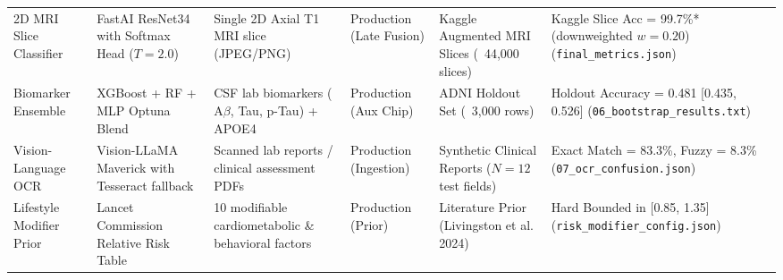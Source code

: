 \begin{table}[t]
\begin{adjustbox}{max width=\linewidth}
\begin{tabular}{p{2.3cm}p{3.0cm}p{2.6cm}p{2.0cm}p{2.2cm}p{3.0cm}}
2D MRI Slice Classifier & FastAI ResNet34 with Softmax Head ($T=2.0$) & Single 2D Axial T1 MRI slice (JPEG/PNG) & Production (Late Fusion) & Kaggle Augmented MRI Slices (~44,000 slices) & Kaggle Slice Acc = 99.7\%* (downweighted $w=0.20$) (\texttt{final\_metrics.json}) \\
Biomarker Ensemble & XGBoost + RF + MLP Optuna Blend & CSF lab biomarkers ($\text{A}\beta$, Tau, p-Tau) + APOE4 & Production (Aux Chip) & ADNI Holdout Set (~3,000 rows) & Holdout Accuracy = 0.481 [0.435, 0.526] (\texttt{06\_bootstrap\_results.txt}) \\
Vision-Language OCR & Vision-LLaMA Maverick with Tesseract fallback & Scanned lab reports / clinical assessment PDFs & Production (Ingestion) & Synthetic Clinical Reports ($N=12$ test fields) & Exact Match = 83.3\%, Fuzzy = 8.3\% (\texttt{07\_ocr\_confusion.json}) \\
Lifestyle Modifier Prior & Lancet Commission Relative Risk Table & 10 modifiable cardiometabolic \& behavioral factors & Production (Prior) & Literature Prior (Livingston et al. 2024) & Hard Bounded in [0.85, 1.35] (\texttt{risk\_modifier\_config.json}) \\
\bottomrule
\end{tabular}
\end{adjustbox}
\end{table}
